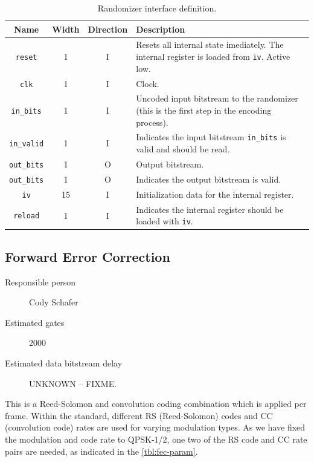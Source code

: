 \documentclass[dvips,10pt,twocolumn]{article}
\newcommand{\wire}{\texttt}
\begin{document}
\begin{table} \begin{tabularx}{\linewidth}{c|c|c|X}
	\label{tbl:rand-io}
	Name & Width & Direction & Description \\ \hline
	
	\wire{reset}     & 1  & I & Resets all internal state
	imediately. The internal register is loaded from
	\wire{iv}. Active low. \\

	\wire{clk}       & 1  & I & Clock. \\

	\wire{in\_bits}  & 1  & I & Uncoded input bitstream to the
	randomizer (this is the first step in the encoding process).\\

	\wire{in\_valid} & 1  & I & Indicates the input bitstream
	\wire{in\_bits} is valid and should be read. \\

	\wire{out\_bits} & 1  & O & Output bitstream. \\
	
	\wire{out\_bits} & 1  & O & Indicates the output bitstream
	is valid. \\

	\wire{iv}        & 15 & I & Initialization data for the
	internal register. \\

	\wire{reload}    & 1  & I & Indicates the internal
	register should be loaded with \wire{iv}. \\

\end{tabularx}
\caption{Randomizer interface definition.}
\end{table}
	

\subsection{Forward Error Correction}
\label{sec:fec}
\begin{description}
	\item[Responsible person] Cody Schafer 
	\item[Estimated gates] 2000
	\item[Estimated data bitstream delay] UNKNOWN -- FIXME.
\end{description}

This is a Reed-Solomon and convolution coding combination
which is applied per frame. Within the standard, different
RS (Reed-Solomon) codes and CC (convolution code) rates are
used for varying modulation types. As we have fixed the
modulation and code rate to QPSK-1/2, one two of the RS
code and CC rate pairs are needed, as indicated in the
\autoref{tbl:fec-param}.
\end{document}
